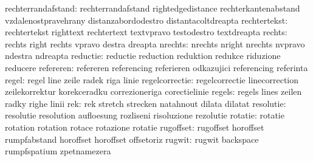        rechterrandafstand: rechterrandafstand        rightedgedistance
                           rechterkantenabstand      vzdalenostpravehrany
                           distanzabordodestro       distantacoltdreapta
             rechtertekst: rechtertekst              righttext
                           rechtertext               textvpravo
                           testodestro               textdreapta %
                   rechts: rechts                    right
                           rechts                    vpravo
                           destra                    dreapta
                  nrechts: nrechts                   nright
                           nrechts                   nvpravo
                           ndestra                   ndreapta
                 reductie: reductie                  reduction
                           reduktion                 redukce
                           riduzione                 reducere
                refereren: refereren                 referencing
                           referieren                odkazujici
                           referencing               referinta %
                    regel: regel                     line
                           zeile                     radek
                           riga                      linie
           regelcorrectie: regelcorrectie            linecorrection
                           zeilekorrektur            korekceradku
                           correzioneriga            corectielinie
                   regels: regels                    lines
                           zeilen                    radky
                           righe                     linii
                      rek: rek                       stretch
                           strecken                  natahnout
                           dilata                    dilatat %
                resolutie: resolutie                 resolution
                           aufloesung                rozliseni
                           risoluzione               rezolutie
                  rotatie: rotatie                   rotation
                           rotation                  rotace
                           rotazione                 rotatie
                rugoffset: rugoffset                 horoffset
                           rumpfabstand              horoffset
                           horoffset                 offsetoriz %
                   rugwit: rugwit                    backspace
                           rumpfspatium              zpetnamezera
